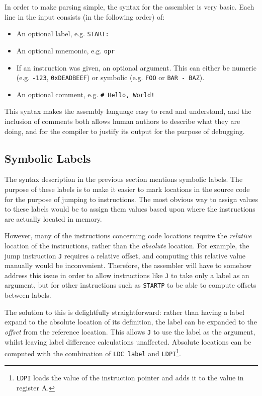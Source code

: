 In order to make parsing simple, the syntax for the assembler is very basic.
Each line in the input consists (in the following order) of:
\begin{itemize}
  \item An optional label, e.g. \texttt{START:}
  \item An optional \gls{mnemonic}, e.g. \texttt{opr}
  \item If an instruction was given, an optional argument. This can either be
        numeric (e.g. \texttt{-123}, \texttt{0xDEADBEEF}) or symbolic
        (e.g. \texttt{FOO} or \texttt{BAR - BAZ}).
  \item An optional comment, e.g. \texttt{\# Hello, World!}
\end{itemize}
This syntax makes the assembly language easy to read and understand, and the
inclusion of comments both allows human authors to describe what they are doing,
and for the compiler to justify its output for the purpose of debugging.

\subsection{Symbolic Labels}

The syntax description in the previous section mentions symbolic labels. The
purpose of these labels is to make it easier to mark locations in the source
code for the purpose of jumping to instructions. The most obvious way to assign
values to these labels would be to assign them values based upon where the
instructions are actually located in memory.

However, many of the instructions concerning code locations require the
\textit{relative} location of the instructions, rather than the
\textit{absolute} location. For example, the jump instruction \texttt{J}
requires a relative offset, and computing this relative value manually would be
inconvenient. Therefore, the assembler will have to somehow address this issue
in order to allow instructions like \texttt{J} to take only a label as an
argument, but for other instructions such as \texttt{STARTP} to be able to
compute offsets between labels.

The solution to this is delightfully straightforward: rather than having a label
expand to the absolute location of its definition, the label can be expanded to
the \textit{offset} from the reference
location\textsuperscript{\cite{supervisor}}. This allows \texttt{J} to use the
label as the argument, whilst leaving label difference calculations unaffected.
Absolute locations can be computed with the combination of \texttt{LDC label}
and \texttt{LDPI}\footnote{\texttt{LDPI} loads the value of the instruction
pointer and adds it to the value in register A.}.

